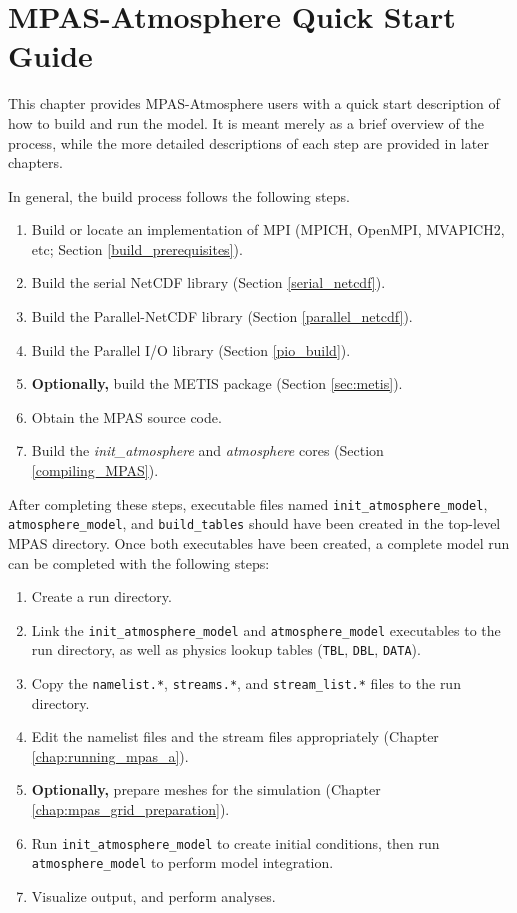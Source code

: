 \chapter{MPAS-Atmosphere Quick Start Guide}
\label{chap:quick_start}

This chapter provides MPAS-Atmosphere users with a quick start description of
how to build and run the model. It is meant merely as a brief overview of the
process, while the more detailed descriptions of each step are provided in later
chapters.

In general, the build process follows the following steps.

\begin{enumerate}
	\item Build or locate an implementation of MPI (MPICH, OpenMPI, MVAPICH2, etc; Section \ref{build_prerequisites}).
	\item Build the serial NetCDF library (Section \ref{serial_netcdf}).
	\item Build the Parallel-NetCDF library (Section \ref{parallel_netcdf}).
	\item Build the Parallel I/O library (Section \ref{pio_build}).
	\item {\bf Optionally,} build the METIS package (Section \ref{sec:metis}).
	\item Obtain the MPAS source code.
	\item Build the {\em init\_atmosphere} and {\em atmosphere} cores (Section \ref{compiling_MPAS}).
\end{enumerate}

After completing these steps, executable files named {\tt init\_atmosphere\_model}, 
{\tt atmosphere\_model}, and {\tt build\_tables} should have been created in the top-level MPAS directory. Once
both executables have been created, a complete model run can be completed with the following steps:

\begin{enumerate}
	\item Create a run directory.
	\item Link the {\tt init\_atmosphere\_model} and {\tt atmosphere\_model} executables to the run directory, as well as physics lookup tables ({\tt *TBL}, {\tt *DBL}, {\tt *DATA}).
	\item Copy the {\tt namelist.*}, {\tt streams.*}, and {\tt stream\_list.*} files to the run directory. 
	\item Edit the namelist files and the stream files appropriately (Chapter \ref{chap:running_mpas_a}).
	\item {\bf Optionally,} prepare meshes for the simulation (Chapter \ref{chap:mpas_grid_preparation}).
	\item Run {\tt init\_atmosphere\_model} to create initial conditions, then run {\tt atmosphere\_model} to perform model integration.
	\item Visualize output, and perform analyses.
\end{enumerate}
